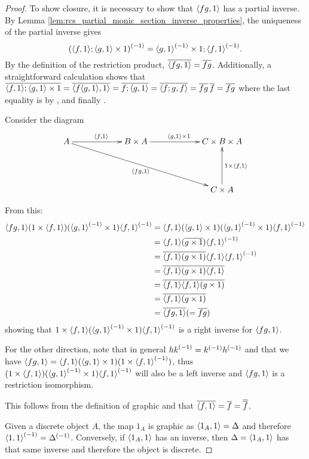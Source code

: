     \begin{proof}
      \bproofenum
        \item To show closure, it is necessary to show that $\langle f g,1\rangle$ has a partial inverse.
          By Lemma \ref{lem:rcs_partial_monic_section_inverse_properties}, the uniqueness of the 
          partial inverse gives
          \[
            {(\langle f,1\rangle ; \langle g,1\rangle\times 1)}^{(-1)} = {\langle g,1\rangle}^{(-1)} \times 1 ; {\langle f,1\rangle}^{(-1)} .
          \]
          By the definition of the restriction product, $\overline{\langle f g,1\rangle} = \overline{f g}$. Additionally,
          a straightforward calculation shows that 
            $\overline{\langle f,1\rangle;\langle g,1\rangle \times 1} = 
              \overline{\langle f\langle g,1\rangle, 1\rangle} = \overline{f ;\langle g,1\rangle}
              = \overline{\langle f;g, f\rangle} = \overline{f g}\,\overline{f} = \overline{f g}
            $ 
          where the last equality is by \rtwo, \rthree and finally \rone.

        Consider the diagram
        \[
          \xymatrix @C+35pt @R+20pt{
            A \ar[r]^{\<f,1\>} \ar[drr]_{\<f g,1\>} &
               B \times A  \ar[r]^{\<g,1\> \times 1}
               &  C \times B \times A \\
            &&C \times A \ar[u]_{1 \times \<f,1\>}
          }
        \]

        From this:
        \begin{align*}
          \langle f g,1\rangle  (1\times \langle f,1\rangle) ( {\langle g,1\rangle}^{(-1)}\times 1) {\langle f,1\rangle}^{(-1)}
          &=\langle f,1\rangle(\langle g,1\rangle\times 1 ) ({\langle g,1\rangle}^{(-1)}\times 1) {\langle f,1\rangle}^{(-1)}\\
          &=\langle f,1\rangle (\overline{g\times 1}) {\langle f,1\rangle}^{(-1)}\\
          &=\overline{\langle f,1\rangle (g\times 1)}  \langle f,1\rangle {\langle f,1\rangle}^{(-1)}\\
          &=\overline{\langle f,1\rangle (g\times 1)}  \overline{\langle f,1\rangle}\\
          &= \overline{\langle f,1\rangle} \overline{\langle f,1\rangle(g\times 1)}\\
          &= \overline{\langle f,1\rangle (g\times 1)}\\
          &= \overline{\langle f g,1\rangle}(=\overline{f g})\\
        \end{align*}
        showing that $1\times \langle f,1\rangle  ({\langle g,1\rangle}^{(-1)}\times 1 ) {\langle f,1\rangle}^{(-1)}$ is
        a right inverse for $\langle f g,1\rangle$.

        For the other direction, note that in general ${h k}^{(-1)} = {k}^{(-1)}{h}^{(-1)}$ and that
        we have $\langle f g,1\rangle = \langle f,1\rangle (\langle g,1\rangle\times 1)  (1 \times {\langle f,1\rangle}^{(-1)})$, thus
        $(1\times \langle f,1\rangle)  ({\langle g,1\rangle}^{(-1)}\times 1) {\langle f,1\rangle}^{(-1)}$ will also be a left inverse and
        $\langle f g,1\rangle$ is a restriction isomorphism.

        \item This follows from the definition of graphic and that
           $\overline{\langle f,1\rangle} = \overline{f} = \overline{\overline{f}}$.

        \item Given a discrete object $A$, the map $1_A$ is graphic as $\langle1_A,1\rangle = \Delta$ 
          and therefore ${\langle1,1\rangle}^{(-1)} = {\Delta}^{(-1)}$. Conversely, if $\langle1_A,1\rangle$ has an inverse, 
          then $\Delta = \langle1_A,1\rangle$ has that same inverse and therefore the object is discrete.
      \eproofenum
    \end{proof}

